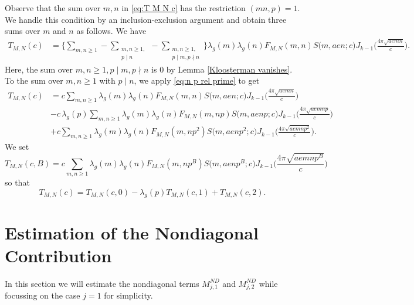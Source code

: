 \documentclass[12pt]{amsart}
\theoremstyle{plain}
\theoremstyle{definition}
\begin{document}
Observe that the sum over $m, n$ in \eqref{eq:T M N c} has the restriction $(mn, p)=1$. We handle this condition by an inclusion-exclusion argument and obtain three sums over $m$ and $n$ as follows. We have
    \begin{align*}
  T_{M, N}(c)    &=\bigg\{ \sum_{m, n \geq 1}-
    \sum_{\substack{m, n \geq 1,\\ p \mid n}} 
    - \sum_{\substack{m, n \geq 1, \\ p\mid m, p\nmid n}} \bigg\}
    \lambda_g(m) \lambda_g(n)
    F_{M, N}(m, n) S\big(m, aen; c\big)
    J_{k-1}\Big(\frac{4\pi\sqrt{aemn}}{c}\Big).
    \end{align*}
Here, the sum over $m,n\geq 1, p\mid m, p \nmid n$ is $0$ by Lemma \ref{Kloosterman vanishes}. To the sum over $m,n\geq 1$ with $ p \mid n$, we apply \eqref{eq:n p rel prime} to get
    \begin{equation*}\label{eq:TMN as sum}
    \begin{split}
    T_{M, N}(c) 
    &=  c \sum_{m, n \geq 1}
    \lambda_g(m) \lambda_g(n)
    F_{M, N}(m, n) S\big(m, aen; c\big)
    J_{k-1}\Big(\frac{4\pi\sqrt{aemn}}{c}\Big) \\
    &-c\, \lambda_g(p)   \sum_{m, n \geq 1}
    \lambda_g(m) \lambda_g(n)
    F_{M, N}(m, np) S\big(m, aenp; c\big)
    J_{k-1}\Big(\frac{4\pi\sqrt{aemnp}}{c}\Big) \\
    &+c \sum_{m, n \geq 1}
    \lambda_g(m) \lambda_g(n)
    F_{M, N}(m, np^2) S\big(m, aenp^2; c\big)
    J_{k-1}\Big(\frac{4\pi\sqrt{aemnp^2}}{c}\Big). 
       \end{split}
    \end{equation*}
We set \begin{equation}\label{eqn:TScB}T_{M,N}(c,B)=c\sum_{m, n \geq 1}
    \lambda_g(m) \lambda_g(n)
    F_{M, N}(m, np^B) S\big(m, aenp^B; c\big)
    J_{k-1}\Big(\frac{4\pi\sqrt{aemnp^B}}{c}\Big)
    \end{equation} so that 
\begin{equation}\label{eqn:TMNc-TS}T_{M, N}(c) =T_{M,N}(c, 0)- \lambda_g(p)
    T_{M,N}(c, 1) +
     T_{M,N}(c, 2).
     \end{equation}



\section{Estimation of the Nondiagonal Contribution}\label{sec:second moment-1}

In this section we will  estimate the nondiagonal terms $M^{ND}_{j, 1}$ and $M^{ND}_{j, 2}$ while focussing on the case $j=1$ for simplicity.
\end{document}
